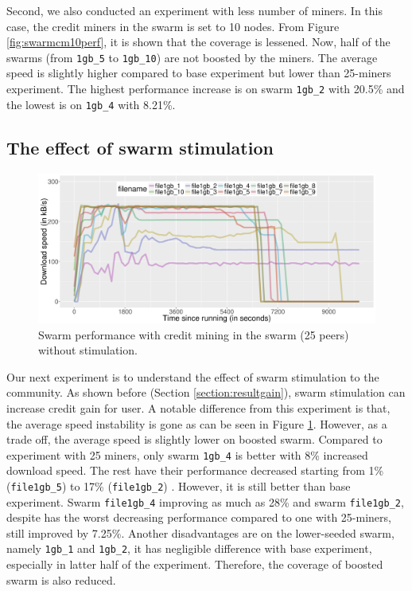 Second, we also conducted an experiment with less number of miners. In this case, the credit miners in the swarm is set to 10 nodes. From Figure \ref{fig:swarmcm10perf}, it is shown that the coverage is lessened. Now, half of the swarms (from \texttt{1gb\_5} to \texttt{1gb\_10}) are not boosted by the miners. The average speed is slightly higher compared to base experiment but lower than 25-miners experiment. The highest performance increase is on swarm \texttt{1gb\_2} with 20.5\% and the lowest is on \texttt{1gb\_4} with 8.21\%.


\subsection{The effect of swarm stimulation}
\begin{figure}[h!]
	\centering
	\includegraphics[width=\textwidth]{pics/results/swperf_sc1_notrig.png}
	\caption{Swarm performance with credit mining in the swarm (25 peers) without stimulation.}
	\label{fig:swarmcm25perfnotrig}
\end{figure}

Our next experiment is to understand the effect of swarm stimulation to the community. As shown before (Section \ref{section:resultgain}), swarm stimulation can increase credit gain for user. A notable difference from this experiment is that, the average speed instability is gone as can be seen in Figure \ref{fig:swarmcm25perfnotrig}. However, as a trade off, the average speed is slightly lower on boosted swarm. Compared to experiment with 25 miners, only swarm \texttt{1gb\_4} is better with 8\% increased download speed. The rest have their performance decreased starting from 1\% (\texttt{file1gb\_5}) to 17\% (\texttt{file1gb\_2}) . However, it is still better than base experiment. Swarm \texttt{file1gb\_4} improving as much as 28\% and swarm \texttt{file1gb\_2}, despite has the worst decreasing performance compared to one with 25-miners, still improved by 7.25\%. Another disadvantages are on the lower-seeded swarm, namely \texttt{1gb\_1} and \texttt{1gb\_2}, it has negligible difference with base experiment, especially in latter half of the experiment. Therefore, the coverage of boosted swarm is also reduced. 

